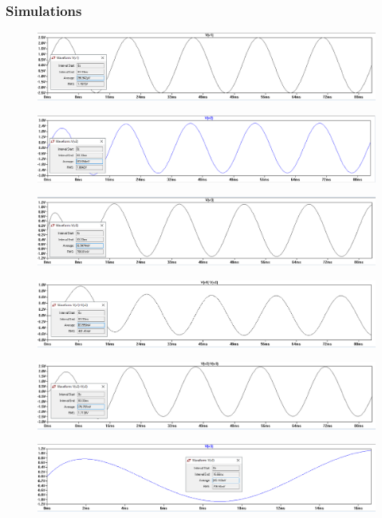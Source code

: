 \documentclass[letterpaper]{article}
\begin{document}
\subsubsection{Simulations}
\begin{figure}[H]
    \centering
    \includegraphics[width=\linewidth]{div-v1}
\end{figure}
\begin{figure}[H]
    \centering
    \includegraphics[width=\linewidth]{div-v2}
\end{figure}
\begin{figure}[H]
    \centering
    \includegraphics[width=\linewidth]{div-v3}
\end{figure}
\begin{figure}[H]
    \centering
    \includegraphics[width=\linewidth]{div-cap}
\end{figure}
\begin{figure}[H]
    \centering
    \includegraphics[width=\linewidth]{div-res}
\end{figure}
\begin{figure}[H]
    \centering
    \includegraphics[width=\linewidth]{div-ind}
\end{figure}
\end{document}
